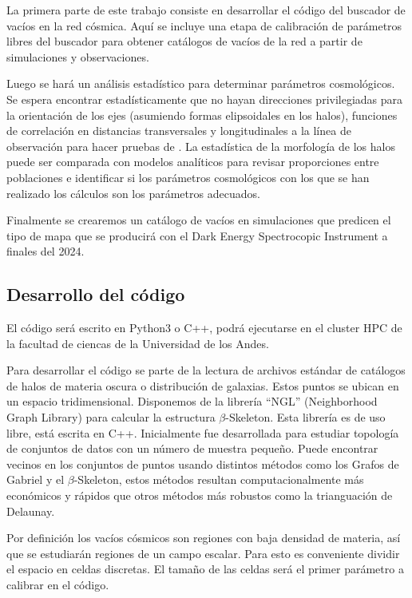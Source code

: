 \documentclass[preprint]{aastex62}
\begin{document}
  La primera parte de este trabajo consiste en desarrollar el código del buscador de vacíos
  en la red cósmica. Aquí se incluye una etapa de calibración de parámetros libres del buscador
  para obtener catálogos de vacíos de la red a partir de simulaciones y observaciones.
   
  Luego se hará un análisis estadístico para determinar parámetros cosmológicos.
  Se espera encontrar estadísticamente que no hayan direcciones privilegiadas para la orientación
  de los ejes (asumiendo formas elipsoidales en los halos), funciones de correlación en distancias
  transversales y longitudinales a la línea de observación para hacer pruebas de
  \citet{AlcockPaczynski1979}. La estadística de la morfología de los halos puede ser comparada
  con modelos analíticos para revisar proporciones entre poblaciones e identificar si los
  parámetros cosmológicos con los que se han realizado los cálculos son los parámetros adecuados.
  
  Finalmente se crearemos un cat\'alogo de vac\'ios en simulaciones
  que predicen el tipo de mapa que se producir\'a con el Dark Energy
  Spectrocopic Instrument a finales del 2024. 

  \subsection{Desarrollo del código}

  El código será escrito en Python3 o C++, podrá ejecutarse en el
  cluster HPC de la facultad de ciencas de la Universidad de los Andes.
  
  Para desarrollar el código se parte de la lectura de archivos estándar de catálogos de halos
  de materia oscura o distribución de galaxias. Estos puntos se ubican en un espacio tridimensional.
  Disponemos de la librería ``NGL''\citep{ngl} (Neighborhood Graph Library)
  para calcular la estructura $\beta$-Skeleton. Esta librería es de uso libre, está escrita en C++.
  Inicialmente fue desarrollada para estudiar topología de conjuntos de datos con un número de muestra
  pequeño. Puede encontrar vecinos en los conjuntos de puntos usando distintos métodos como los
  Grafos de Gabriel y el $\beta$-Skeleton, estos métodos resultan computacionalmente más económicos
  y rápidos que otros métodos más robustos como la trianguación de Delaunay.
  
  Por definición los vacíos cósmicos son regiones con baja densidad de materia, así que se
  estudiarán regiones de un campo escalar. Para esto es conveniente dividir el espacio en
  celdas discretas. El tamaño de las celdas será el primer parámetro a calibrar en el código.
  
\end{document}
